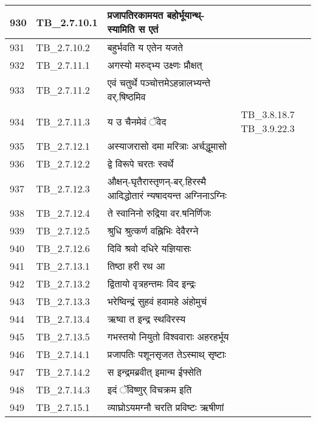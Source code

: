 \documentclass[17pt]{extarticle}
\begin{document}
\begin{longtable}{||p{0.4in}||p{0.9in}||p{4.0in}||p{0.9in}||}
        \hline
            930 & TB\_2.7.10.1 & प्रजापतिरकामयत बहोर्भूयान्थ्{-}स्यामिति स एतं &      \\
        \hline
            931 & TB\_2.7.10.2 & बहुर्भवति य एतेन यजते &      \\
        \hline
            932 & TB\_2.7.11.1 & अगस्यो मरुद्भ्य उक्ष्णः प्रौक्षत् &      \\
        \hline
            933 & TB\_2.7.11.2 & एवं चतुर्थे पञ्चोत्तमेऽहन्नालभ्यन्ते वर्.षिष्ठमिव &      \\
        \hline
            934 & TB\_2.7.11.3 & य उ चैनमेवं ॅवेद &  TB\_3.8.18.7 TB\_3.9.22.3       \\
        \hline
            935 & TB\_2.7.12.1 & अस्याजरासो दमा मरित्राः अर्चद्धूमासो &      \\
        \hline
            936 & TB\_2.7.12.2 & द्वे विरूपे चरतः स्वर्थे &      \\
        \hline
            937 & TB\_2.7.12.3 & औक्षन्{-}घृतैरास्तृणन्{-}बर्.हिरस्मै आदिद्धोतारं न्यषादयन्त अग्निनाऽग्निः &      \\
        \hline
            938 & TB\_2.7.12.4 & ते स्वानिनो रुद्रिया वर.षनिर्णिजः &      \\
        \hline
            939 & TB\_2.7.12.5 & श्रुधि श्रुत्कर्ण वह्निभिः देवैरग्ने &      \\
        \hline
            940 & TB\_2.7.12.6 & दिवि श्रवो दधिरे यज्ञियासः &      \\
        \hline
            941 & TB\_2.7.13.1 & तिष्ठा हरी रथ आ &      \\
        \hline
            942 & TB\_2.7.13.2 & द्वितायो वृत्रहन्तमः विद इन्द्रः &      \\
        \hline
            943 & TB\_2.7.13.3 & भरेष्विन्द्रं सुहवं हवामहे अंहोमुचं &      \\
        \hline
            944 & TB\_2.7.13.4 & ऋष्वा त इन्द्र स्थविरस्य &      \\
        \hline
            945 & TB\_2.7.13.5 & गभस्तयो नियुतो विश्ववाराः अहरहर्भूय &      \\
        \hline
            946 & TB\_2.7.14.1 & प्रजापतिः पशूनसृजत तेऽस्माथ् सृष्टाः &      \\
        \hline
            947 & TB\_2.7.14.2 & स इन्द्रमब्रवीत् इमान्म ईफ्सेति &      \\
        \hline
            948 & TB\_2.7.14.3 & इदं ॅविष्णुर् विचक्रम इति &      \\
        \hline
            949 & TB\_2.7.15.1 & व्याघ्रोऽयमग्नौ चरति प्रविष्टः ऋषीणां &      \\

\end{longtable}
\end{document}
